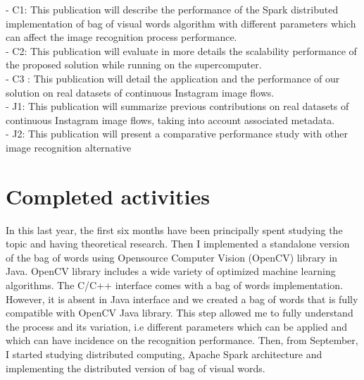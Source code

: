 - C1: This publication will describe the performance of the Spark distributed implementation of bag of visual words algorithm with different parameters which can affect the image recognition process performance.\\
- C2: This publication will evaluate in more details the scalability performance of the proposed solution while running on the supercomputer.\\
- C3 : This publication will detail the application and the performance of our solution on real datasets of continuous Instagram image flows.\\
- J1: This publication will summarize previous contributions on real datasets of continuous Instagram image flows, taking into account associated metadata.\\
- J2: This publication will present a comparative performance study with other image recognition alternative
\section{Completed activities}
In this last year, the first six months have been principally spent studying the topic and having theoretical research. Then I implemented a standalone version of the bag of words using Opensource Computer Vision (OpenCV) library in Java. OpenCV library includes a wide variety of optimized machine learning algorithms. The C/C++ interface comes with a bag of words implementation. However, it is absent in Java interface and we created a bag of words that is fully compatible with OpenCV Java library. This step allowed me to fully understand the process and its variation, i.e different parameters which can be applied and which can have incidence on the recognition performance. Then, from September, I started studying distributed computing, Apache Spark architecture and implementing the distributed version of bag of visual words.
